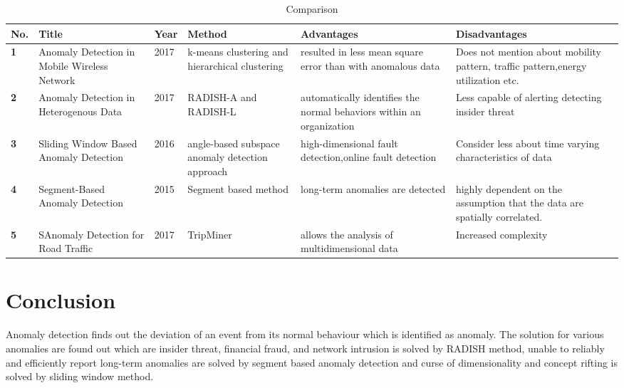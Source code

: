 \documentclass[10pt,a4paper,journal]{IEEEtran}
\begin{document}
\begin{table}[h]
\begin{tabular}{|p{0.30cm}|p{1.5cm}|p{.60cm}|p{1.50cm}|p{1.50cm}|p{2cm}|}
\hline
\textbf{ No.}&{Title}&{Year}&{Method}&{Advantages}&{Disadvantages}\\
\hline
\hline
\textbf{1}&Anomaly Detection in Mobile Wireless Network&2017&k-means clustering and hierarchical clustering& resulted in less mean square error than with anomalous data& Does not mention about mobility pattern, traffic pattern,energy utilization etc. \\
\hline


\hline

\textbf{2}&Anomaly Detection in Heterogenous Data&2017&RADISH-A and RADISH-L &automatically identifies the normal behaviors
within an organization&Less capable of alerting detecting insider threat\\


\hline
\textbf{3}&Sliding Window Based Anomaly Detection&2016& angle-based subspace anomaly
detection approach&high-dimensional fault
detection,online fault detection&Consider less about time varying characteristics of data\\
\hline

\textbf{4}&Segment-Based Anomaly Detection&2015& Segment based method&long-term anomalies are detected&highly dependent on the assumption that the data are spatially correlated.\\
\hline



\textbf{5}&SAnomaly Detection for Road Traffic&2017& TripMiner&allows the analysis of multidimensional data&Increased complexity\\
\hline

\end {tabular}

\caption{Comparison}
\end{table}

\section{Conclusion}
\par Anomaly detection finds out the deviation of an event from its normal behaviour which is identified as anomaly. The solution for various anomalies are found out which are insider threat, financial fraud, and network intrusion is solved by RADISH method, unable to reliably and efficiently report long-term anomalies are solved by segment based anomaly detection and curse of dimensionality and concept rifting is solved by sliding window method.
\end{document}
